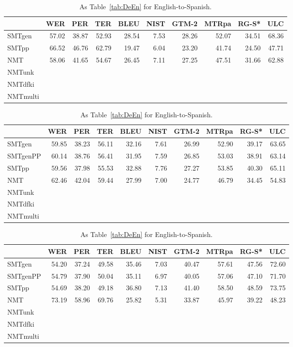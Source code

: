 \documentclass[a4paper,11pt]{article}
\begin{document}
\begin{table}[t]
\small
{}
\begin{tabular}{lrrrrrrrrr}
\toprule
         & WER   &  PER  & TER   &  BLEU & NIST & GTM-2 & MTRpa & RG-S* & ULC \\
\midrule
SMTgen	 & 57.02 & 38.87 & 52.93 & 28.54 & 7.53 & 28.26 & 52.07 & 34.51 & 68.36 \\  
SMTpp	 & 66.52 & 46.76 & 62.79 & 19.47 & 6.04 & 23.20 & 41.74 & 24.50 & 47.71 \\  
NMT	 & 58.06 & 41.65 & 54.67 & 26.45 & 7.11 & 27.25 & 47.51 & 31.66 & 62.88 \\  
NMTunk  \\
NMTdfki \\
NMTmulti \\
\bottomrule
\end{tabular}

\begin{tabular}{lrrrrrrrrr}
\toprule
         & WER   &  PER  & TER   &  BLEU & NIST & GTM-2 & MTRpa & RG-S* & ULC \\
\midrule
SMTgen	 & 59.85 & 38.23 & 56.11 & 32.16 & 7.61 & 26.99 & 52.90 & 39.17 & 63.65 \\  
SMTgenPP & 60.14 & 38.76 & 56.41 & 31.95 & 7.59 & 26.85 & 53.03 & 38.91 & 63.14 \\  
SMTpp	 & 59.56 & 37.98 & 55.53 & 32.88 & 7.76 & 27.27 & 53.85 & 40.30 & 65.11 \\  
NMT	 & 62.46 & 42.04 & 59.44 & 27.99 & 7.00 & 24.77 & 46.79 & 34.45 & 54.83 \\  
NMTunk  \\
NMTdfki \\
NMTmulti \\
\bottomrule
\end{tabular}

\begin{tabular}{lrrrrrrrrr}
\toprule
         & WER   &  PER  & TER   &  BLEU & NIST & GTM-2 & MTRpa & RG-S* & ULC \\
\midrule
SMTgen	 & 54.20 & 37.24 & 49.58 & 35.46 & 7.03 & 40.47 & 57.61 & 47.56 & 72.60 \\  
SMTgenPP & 54.79 & 37.90 & 50.04 & 35.11 & 6.97 & 40.05 & 57.06 & 47.10 & 71.70 \\  
SMTpp	 & 54.69 & 38.20 & 49.18 & 36.80 & 7.13 & 41.40 & 58.50 & 48.59 & 73.75 \\  
NMT	 & 73.19 & 58.96 & 69.76 & 25.82 & 5.31 & 33.87 & 45.97 & 39.22 & 48.23 \\  
NMTunk  \\
NMTdfki \\
NMTmulti \\
\bottomrule
\end{tabular}
 \caption{As Table~\ref{tab:DeEn} for English-to-Spanish.}
 \label{tab:EnEs}
\end{table}
\end{document}

